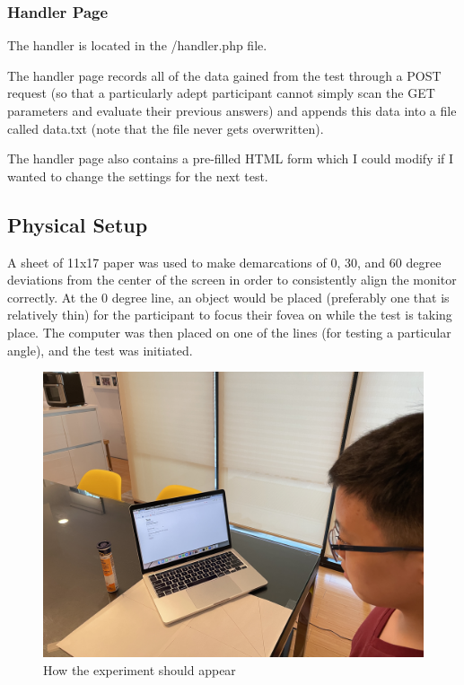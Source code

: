 \documentclass[12pt]{article}
\begin{document}
\subsubsection{Handler Page}
The handler is located in the /handler.php file.

The handler page records all of the data gained from the test through a POST
request (so that a particularly adept participant cannot simply scan the GET
parameters and evaluate their previous answers) and appends this data
into a file called data.txt (note that the file never gets overwritten).

The handler page also contains a pre-filled HTML form which I could
modify if I wanted to change the settings for the next test.

\subsection{Physical Setup}
A sheet of 11x17 paper was used to make demarcations of 0, 30, and 60 degree
deviations from the center of the screen in order to consistently align the
monitor correctly. At the 0 degree line, an object would be placed (preferably
one that is relatively thin) for the participant to focus their fovea
on while the test is taking place.  The computer was then placed on one of the
lines (for testing a particular angle), and the test was initiated.


\begin{figure}
\centering
\includegraphics[scale=0.3]{diagram.JPG}
\caption{How the experiment should appear}
\end{figure}
\end{document}
